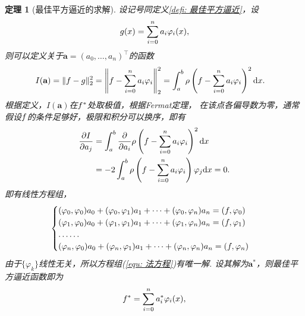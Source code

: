 \documentclass[12pt, a4paper]{article}
\theoremstyle{margin}
\newtheorem{thm}{定理}
\newcommand{\tr}{^\intercal}
\newcommand{\tbf}{\textbf}
\newcommand{\f}{\mathnormal{f}}
\newcommand{\g}{\mathnormal{g}}
\newcommand{\rd}{\mathrm{d}}
\newcommand\defref[1]{定义\ref{#1}}
\newcommand\equref[1]{(\ref{#1})}
\begin{document}
  \begin{thm}[最佳平方逼近的求解]
    设记号同\defref{defi: 最佳平方逼近}，设
    \[
      \g(x) = \sum_{i=0}^na_i\varphi_i(x),
    \]
    则可以定义关于$\tbf{a} = (a_0,\dots,a_n)\tr$的函数
    \[\begin{split}
      I(\tbf{a}) = \|\f-\g\|_2^2 &=
      \left\|\f - \sum_{i=0}^na_i\varphi_i\right\|_2^2
      =  \int_a^b \rho\left( \f-\sum_{i=0}^n a_i\varphi_i \right)^2 \rd x.
    \end{split}\]
    根据定义，$I(\tbf{a})$在$\f^*$处取极值，根据Fermat定理，
    在该点各偏导数为零，通常假设$\f$的条件足够好，极限和积分可以换序，即有
    \[\begin{split}
      \frac{\partial I}{\partial a_j} &=
      \int_a^b \frac{\partial}{\partial a_i}
      \rho\left( \f-\sum_{i=0}^n a_i\varphi_i \right)^2 \rd x\\
      &= -2\int_a^b\rho\left( \f-\sum_{i=0}^n a_i\varphi_i \right)\varphi_j \rd x
      = 0.
    \end{split}\]
    即有线性方程组，
    \begin{equation}\begin{cases}
      \label{equ: 法方程}
      (\varphi_0, \varphi_0)a_0 + (\varphi_0, \varphi_1)a_1 + \cdots + (\varphi_0, \varphi_n)a_n = (\f, \varphi_0) \\
      (\varphi_1, \varphi_0)a_0 + (\varphi_1, \varphi_1)a_1 + \cdots + (\varphi_1, \varphi_n)a_n = (\f, \varphi_1) \\
      \dots\dots\\
      (\varphi_n, \varphi_0)a_0 + (\varphi_n, \varphi_1)a_1 + \cdots + (\varphi_n, \varphi_n)a_n = (\f, \varphi_n)
    \end{cases}\end{equation}
    由于$\{\varphi_k\}$线性无关，所以方程组\equref{equ: 法方程}有唯一解.
    设其解为$\tbf{a}^*$，则最佳平方逼近函数即为
    \[
      \f^* = \sum_{i=0}^na^*_i\varphi_i(x),
    \]
  \end{thm}
\end{document}
